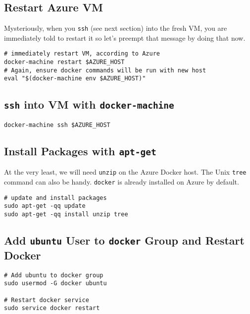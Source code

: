 \documentclass{article}
\begin{document}
\subsection{Restart Azure VM}
\label{sec:orgheadline7}

Mysteriously, when you \texttt{ssh} (see next section) into the fresh VM, you are immediately told to restart it so let's preempt that message by doing that now.

\begin{verbatim}
# immediately restart VM, according to Azure
docker-machine restart $AZURE_HOST
# Again, ensure docker commands will be run with new host
eval "$(docker-machine env $AZURE_HOST)"
\end{verbatim}


\subsection{\texttt{ssh} into VM with \texttt{docker-machine}}
\label{sec:orgheadline8}

\begin{verbatim}
docker-machine ssh $AZURE_HOST
\end{verbatim}


\subsection{Install Packages with \texttt{apt-get}}
\label{sec:orgheadline9}

At the very least, we will need \texttt{unzip} on the Azure Docker host. The Unix \texttt{tree} command can also be handy. \texttt{docker} is already installed on Azure by default.

\begin{verbatim}
# update and install packages
sudo apt-get -qq update
sudo apt-get -qq install unzip tree
\end{verbatim}

\subsection{\label{orgtarget6}Add \texttt{ubuntu} User to \texttt{docker} Group and Restart Docker}
\label{sec:orgheadline10}

\begin{verbatim}
# Add ubuntu to docker group
sudo usermod -G docker ubuntu

# Restart docker service
sudo service docker restart
\end{verbatim}
\end{document}
